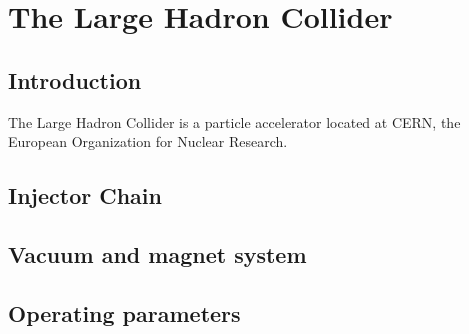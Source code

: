 \chapter{The Large Hadron Collider}
\label{chap:LHC}

\section{Introduction}
\label{sec:LHCintro}
The Large Hadron Collider is a particle accelerator located at CERN, the European Organization for Nuclear Research. 

\section{Injector Chain}
\label{sec:injector}

\section{Vacuum and magnet system}
\label{sec:VacMag}

\section{Operating parameters}
\label{sec:operatingParams}
